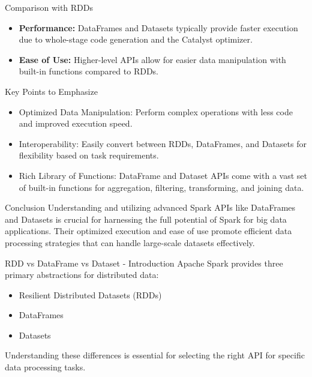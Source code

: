 \documentclass[aspectratio=169]{beamer}
\begin{document}
\begin{frame}[fragile]{Comparison with RDDs}
    \begin{itemize}
        \item \textbf{Performance:} DataFrames and Datasets typically provide faster execution due to whole-stage code generation and the Catalyst optimizer.
        \item \textbf{Ease of Use:} Higher-level APIs allow for easier data manipulation with built-in functions compared to RDDs.
    \end{itemize}

    \begin{block}{Key Points to Emphasize}
        \begin{itemize}
            \item Optimized Data Manipulation: Perform complex operations with less code and improved execution speed.
            \item Interoperability: Easily convert between RDDs, DataFrames, and Datasets for flexibility based on task requirements.
            \item Rich Library of Functions: DataFrame and Dataset APIs come with a vast set of built-in functions for aggregation, filtering, transforming, and joining data.
        \end{itemize}
    \end{block}
\end{frame}

\begin{frame}[fragile]{Conclusion}
    Understanding and utilizing advanced Spark APIs like DataFrames and Datasets is crucial for harnessing the full potential of Spark for big data applications. Their optimized execution and ease of use promote efficient data processing strategies that can handle large-scale datasets effectively.
\end{frame}

\begin{frame}[fragile]{RDD vs DataFrame vs Dataset - Introduction}
    Apache Spark provides three primary abstractions for distributed data:
    \begin{itemize}
        \item Resilient Distributed Datasets (RDDs)
        \item DataFrames
        \item Datasets
    \end{itemize}
    Understanding these differences is essential for selecting the right API for specific data processing tasks.
\end{frame}
\end{document}
